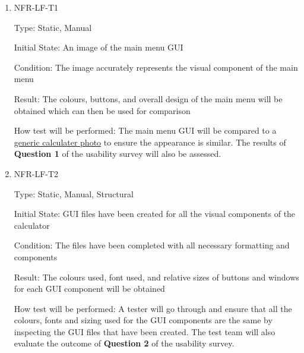 \documentclass[12pt, titlepage]{article}
\begin{document}
\begin{enumerate}

\item{NFR-LF-T1\\}

Type: Static, Manual
					
Initial State: An image of the main menu GUI 
					
Condition: The image accurately represents the visual component of the main menu
					
Result: The colours, buttons, and overall design of the main menu will be obtained which can then be used for comparison
					
How test will be performed: The main menu GUI will be compared to a \hyperref[calc]{generic calculater photo} to ensure the appearance is similar. The results of \textbf{Question 1} of the usability survey will also be assessed.
					
\item{NFR-LF-T2\\}

Type: Static, Manual, Structural
					
Initial State: GUI files have been created for all the visual components of the calculator
					
Condition: The files have been completed with all necessary formatting and components
					
Result: The colours used, font used, and relative sizes of buttons and windows for each GUI component will be obtained
					
How test will be performed: A tester will go through and ensure that all the colours, fonts and sizing used for the GUI components are the same by inspecting the GUI files that have been created. The test team will also evaluate the outcome of \textbf{Question 2} of the usability survey.

\end{enumerate}
\end{document}

